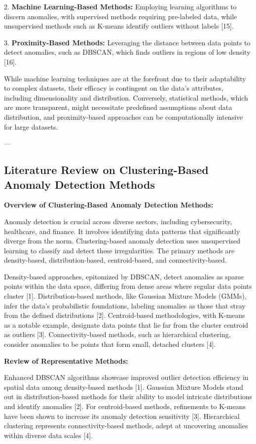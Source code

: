 \documentclass{sigkddExp}
\begin{document}
2. \textbf{Machine Learning-Based Methods:} Employing learning algorithms to discern anomalies, with supervised methods requiring pre-labeled data, while unsupervised methods such as K-means identify outliers without labels [15].

3. \textbf{Proximity-Based Methods:} Leveraging the distance between data points to detect anomalies, such as DBSCAN, which finds outliers in regions of low density [16].

While machine learning techniques are at the forefront due to their adaptability to complex datasets, their efficacy is contingent on the data's attributes, including dimensionality and distribution. Conversely, statistical methods, which are more transparent, might necessitate predefined assumptions about data distribution, and proximity-based approaches can be computationally intensive for large datasets.


---


\subsection{Literature Review on Clustering-Based Anomaly Detection Methods}

\textbf{Overview of Clustering-Based Anomaly Detection Methods:}

Anomaly detection is crucial across diverse sectors, including cybersecurity, healthcare, and finance. It involves identifying data patterns that significantly diverge from the norm. Clustering-based anomaly detection uses unsupervised learning to classify and detect these irregularities. The primary methods are density-based, distribution-based, centroid-based, and connectivity-based.

Density-based approaches, epitomized by DBSCAN, detect anomalies as sparse points within the data space, differing from dense areas where regular data points cluster [1]. Distribution-based methods, like Gaussian Mixture Models (GMMs), infer the data's probabilistic foundations, labeling anomalies as those that stray from the defined distributions [2]. Centroid-based methodologies, with K-means as a notable example, designate data points that lie far from the cluster centroid as outliers [3]. Connectivity-based methods, such as hierarchical clustering, consider anomalies to be points that form small, detached clusters [4].

\textbf{Review of Representative Methods:}

Enhanced DBSCAN algorithms showcase improved outlier detection efficiency in spatial data among density-based methods [1]. Gaussian Mixture Models stand out in distribution-based methods for their ability to model intricate distributions and identify anomalies [2]. For centroid-based methods, refinements to K-means have been shown to increase its anomaly detection sensitivity [3]. Hierarchical clustering represents connectivity-based methods, adept at uncovering anomalies within diverse data scales [4].
\end{document}
